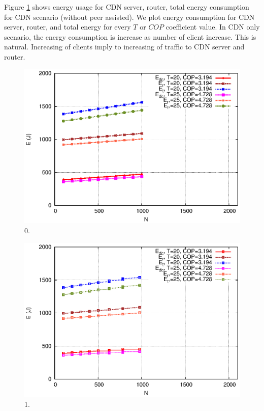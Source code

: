 \documentclass[JIP]{ipsj}
\begin{document}
Figure \ref{fig:4-0} shows energy usage for CDN server, router, total energy consumption for CDN scenario (without peer assisted).
We plot energy consumption for CDN server, router, and total energy for every $T$ or $COP$ coefficient value.
In CDN only scenario, the energy consumption is increase as number of client increase.  
This is natural. 
Increasing of clients imply to increasing of traffic to CDN server and router.

\begin{figure}[thb]
\begin{center}
\includegraphics[scale=0.6]{graphs/cdn.eps}
\end{center}
\caption{0.}
\label{fig:4-0}
\vspace{-2mm}
\end{figure} 

\begin{figure}[thb]
\begin{center}
\includegraphics[scale=0.6]{graphs/cdnp2p-1.eps}
\end{center}
\caption{1.}
\label{fig:4-1}
\vspace{-2mm}
\end{figure} 
\end{document}
